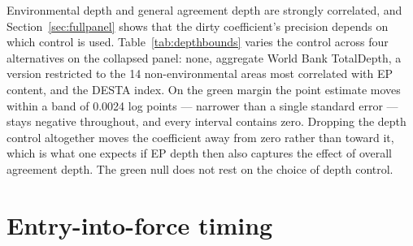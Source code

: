 \documentclass[12pt]{article}
\begin{document}
Environmental depth and general agreement depth are strongly correlated, and
Section~\ref{sec:fullpanel} shows that the dirty coefficient's precision depends on which control is
used. Table~\ref{tab:depthbounds} varies the control across four alternatives on the collapsed panel:
none, aggregate World Bank TotalDepth, a version restricted to the 14 non-environmental areas most
correlated with EP content, and the DESTA index. On the green margin the point estimate moves within a
band of 0.0024 log points --- narrower than a single standard error --- stays negative throughout, and
every interval contains zero. Dropping the depth control altogether moves the coefficient away from
zero rather than toward it, which is what one expects if EP depth then also captures the effect of
overall agreement depth. The green null does not rest on the choice of depth control.



\section{Entry-into-force timing}\label{app:eif}
\end{document}
